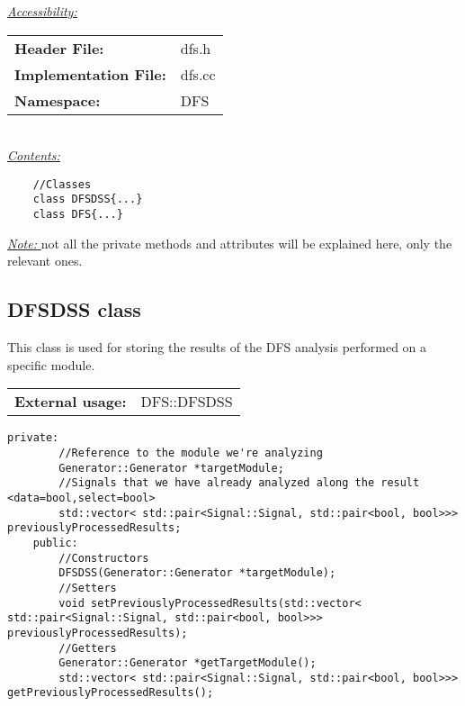 \documentclass{article}
\begin{document}
\underline{\textit{\underline{Accessibility: }}}\\

\begin{tabular}{ll}
	\textbf{Header File:} & dfs.h\\
	\textbf{Implementation File:} & dfs.cc\\
	\textbf{Namespace: } & DFS\\
\end{tabular}\\

\underline{\textit{\underline{Contents: }}}\\

\begin{mdframed}[hidealllines=true, backgroundcolor=green!10]
	\begin{lstlisting}
	//Classes
	class DFSDSS{...}
	class DFS{...}
	\end{lstlisting}
\end{mdframed}


\underline{\textit{Note: }} not all the private methods and attributes will be explained here, only the relevant ones.

\subsection{DFSDSS class}

This class is used for storing the results of the DFS analysis performed on a specific module.\\

\begin{tabular}{ll}
	\textbf{External usage: } & DFS::DFSDSS\\
\end{tabular}

\begin{mdframed}[hidealllines=true, backgroundcolor=magenta!10]
	\begin{lstlisting}[basicstyle=\tiny]
	private:
		//Reference to the module we're analyzing
		Generator::Generator *targetModule;
		//Signals that we have already analyzed along the result <data=bool,select=bool>
		std::vector< std::pair<Signal::Signal, std::pair<bool, bool>>> previouslyProcessedResults;
	public:
		//Constructors
		DFSDSS(Generator::Generator *targetModule);
		//Setters
		void setPreviouslyProcessedResults(std::vector< std::pair<Signal::Signal, std::pair<bool, bool>>> previouslyProcessedResults);
		//Getters
		Generator::Generator *getTargetModule();
		std::vector< std::pair<Signal::Signal, std::pair<bool, bool>>> getPreviouslyProcessedResults();
	\end{lstlisting}
\end{mdframed}
\end{document}
